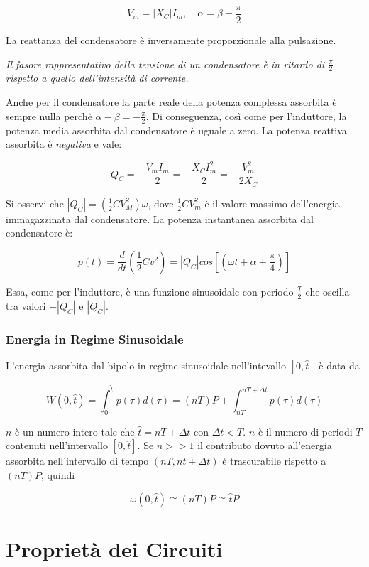 \documentclass[a4paper]{report}
\begin{document}
\[
V_m=|X_C|I_m , \quad \alpha=\beta - \dfrac{\pi}{2}
\]

La reattanza del condensatore \`e inversamente proporzionale alla pulsazione.

\emph{Il fasore rappresentativo della tensione di un condensatore \`e 
in ritardo di $\frac{\pi}{2}$ rispetto a quello dell'intensit\`a di corrente.}

Anche per il condensatore la parte reale della potenza complessa assorbita
\`e sempre nulla perch\`e $\alpha-\beta=-\frac{\pi}{2}$. Di conseguenza, 
cos\`i come per l'induttore, la potenza media assorbita dal condensatore 
\`e uguale a zero. La potenza reattiva assorbita \`e \emph{negativa} e vale:

\[
Q_C=-\dfrac{V_mI_m}{2}=-\dfrac{X_CI^2_m}{2}=-\dfrac{V^2_m}{2X_C}
\]

Si osservi che $|Q_C|=\left(\frac{1}{2}CV^2_M\right)\omega$, dove $\frac{1}{2}CV^2_m$
\`e il valore massimo dell'energia immagazzinata dal condensatore. 
La potenza instantanea assorbita dal condensatore \`e:

\[
p(t)=\dfrac{d}{dt}\left(\dfrac{1}{2}Cv^2\right)=|Q_C|cos\left[\left(\omega t + \alpha+ \dfrac{\pi}{4} \right)\right]
\]

Essa, come per l'induttore, \`e una funzione sinusoidale con periodo $\frac{T}{2}$ 
che oscilla tra valori $-|Q_C|$ e $|Q_C|$.


\subsection{Energia in Regime Sinusoidale}
L'energia assorbita dal bipolo in regime sinusoidale nell'intevallo $[0,
  \widehat {t}]$ \`e data da

\[
W (0, \widehat t)=\int_0^{\widehat t} p(\tau)d(\tau)=(nT)P+
\int_{nT}^{nT+\Delta t} p(\tau)d(\tau)
\]

$n$ \`e un numero intero tale che $\widehat{t}=nT+\Delta t$ con $\Delta t<
T$. $n$ \`e il numero di periodi $T$ contenuti nell'intervallo $[0,
  \widehat t]$.
Se $n>>1$ il contributo dovuto all'energia assorbita nell'intervallo
di tempo $(nT, nt+\Delta t)$ \`e trascurabile rispetto a $(nT)P$,
quindi

\[
\omega(0,\widehat t) \cong (nT)P \cong {\widehat t} P
\]


\chapter{Propriet\`a dei Circuiti}
\end{document}
